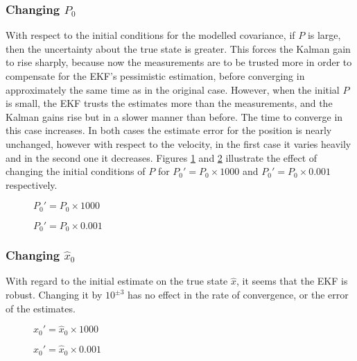 \subsubsection{Changing $P_0$}

	With respect to the initial conditions for the modelled covariance, if $P$ is large, then the uncertainty about the
	true state is greater. This forces the Kalman gain to rise sharply, because now the measurements are to be trusted more
	in order to compensate for the EKF's pessimistic estimation, before converging in approximately the same time as in the original case.
	However, when the initial $P$ is small, the EKF trusts the estimates more than the measurements, and the Kalman gains rise but in a
	slower manner than before. The time to converge in this case increases. In both cases the estimate error for the position is nearly
	unchanged, however with respect to the velocity, in the first case it varies heavily and in the second one it decreases.
	Figures \ref{fig:q4:P1000} and \ref{fig:q4:P001} illustrate the effect of changing the initial conditions of 
	$P$ for $P_0' = P_0 \times 1000$ and $P_0' = P_0 \times 0.001$ respectively.

\begin{figure}[H]
	\scalebox{0.5}{}
	\scalebox{0.5}{}
	\scalebox{0.5}{}

	\caption{$P_0' = P_0 \times 1000$}
	\label{fig:q4:P1000}
\end{figure}

\begin{figure}[H]
	\scalebox{0.5}{}
	\scalebox{0.5}{}
	\scalebox{0.5}{}

	\caption{$P_0' = P_0 \times 0.001$}
	\label{fig:q4:P001}
\end{figure}


\subsubsection{Changing $\hat{x}_0$}

	With regard to the initial estimate on the true state $\hat{x}$, it seems that the EKF is robust. 
	Changing it by $10^{\pm3}$ has no effect in the rate of convergence, or the error of the estimates.

\begin{figure}[H]
	\scalebox{0.5}{}
	\scalebox{0.5}{}
	\scalebox{0.5}{}

	\caption{$\hat{x}_0' = \hat{x}_0 \times 1000$}
	\label{fig:q4:xhat1000}
\end{figure}

\begin{figure}[H]
	\scalebox{0.5}{}
	\scalebox{0.5}{}
	\scalebox{0.5}{}

	\caption{$\hat{x}_0' = \hat{x}_0 \times 0.001$}
	\label{fig:q4:xhat001}
\end{figure}
